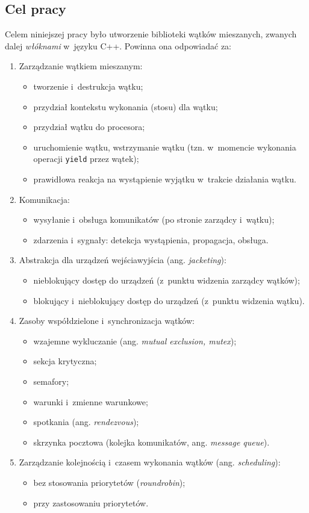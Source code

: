 \documentclass[11pt,makeidx]{mwart}
\begin{document}
\subsection{Cel pracy}
\indent
  Celem niniejszej pracy było utworzenie biblioteki wątków mieszanych, zwanych dalej \emph{włóknami}
	w~języku C++.
	Powinna ona odpowiadać za:
	\begin{enumerate}
		\item Zarządzanie wątkiem mieszanym:
		\begin{itemize}
			\item tworzenie i~destrukcja wątku;
			\item przydział kontekstu wykonania (stosu) dla wątku;
			\item przydział wątku do procesora;
			\item uruchomienie wątku, wstrzymanie wątku (tzn. w~momencie wykonania operacji {\tt yield} przez wątek);
			\item prawidłowa reakcja na wystąpienie wyjątku w~trakcie działania wątku.
		\end{itemize}
		\item Komunikacja:
		\begin{itemize}
			\item wysyłanie i~obsługa komunikatów (po stronie zarządcy i~wątku);
			\item zdarzenia i~sygnały: detekcja wystąpienia, propagacja, obsługa.
		\end{itemize}
		\item \label{itm:communication} Abstrakcja dla urządzeń wejścia\dywiz wyjścia (ang. \emph{jacketing}):
		\begin{itemize}
			\item nieblokujący dostęp do urządzeń (z~punktu widzenia zarządcy wątków);
			\item blokujący i~nieblokujący dostęp do urządzeń (z~punktu widzenia wątku).
		\end{itemize}
		\item \label{itm:shared} Zasoby współdzielone i~synchronizacja wątków:
		\begin{itemize}
			\item wzajemne wykluczanie (ang. \emph{mutual exclusion, mutex});
			\item sekcja krytyczna;
			\item semafory;
			\item warunki i~zmienne warunkowe;
			\item spotkania (ang. \emph{rendezvous});
			\item skrzynka pocztowa (kolejka komunikatów, ang. \emph{message queue}).
		\end{itemize}
		\item Zarządzanie kolejnością i~czasem wykonania wątków (ang. \emph{scheduling}):
		\begin{itemize}
			\item bez stosowania priorytetów (\emph{round\dywiz robin});
			\item przy zastosowaniu priorytetów.
		\end{itemize}
	\end{enumerate}
\end{document}
